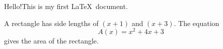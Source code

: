 \documentclass[50pt]{article}
\begin{document}
Hello!This is my first \LaTeX\ document.

A rectangle has side lengths of $(x+1)$ and $(x+3)$.
The equation 
$${A(x)=x^2+4x+3}$$ gives the area of the rectangle.
\end{document}
